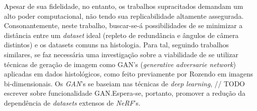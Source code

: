 Apesar de sua fidelidade, no entanto, os trabalhos supracitados demandam um alto poder computacional, não tendo sua replicabilidade altamente assegurada. Consonantemente, neste trabalho, buscar-se-á possibilidades de se minimizar a distância entre um \textit{dataset} ideal (repleto de redundância e ângulos de câmera distintos) e os datasets comuns na histologia. Para tal, seguindo trabalhos similares, se faz necessária uma investigação sobre a viabilidade de se utilizar técnicas de geração de imagem como GAN's (\textit{generative adversarie network}) \cite{goodfellow2014generativeadversarialnetworks} aplicadas em dados histológicos, como feito previamente por Rozendo \cite{rozendo2024histdataaug} em imagens bi-dimensionais.   Os \textit{GAN}'s se baseiam nas técnicas de \textit{deep learning}, // TODO escrever sobre funcionalidade GAN.Espera-se, portanto, promover a redução da dependência de \textit{datasets} extensos de \textit{NeRF}'s. 

\newpage
